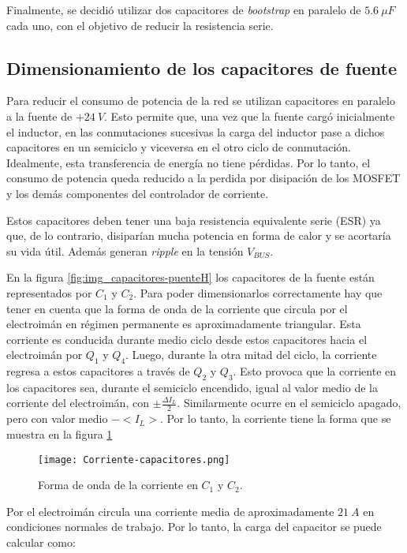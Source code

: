 \noindent Finalmente, se decidió utilizar dos capacitores de \textsl{bootstrap} en paralelo de $5.6 \:\mu F$ cada uno, con el objetivo de reducir la resistencia serie.

\subsection{Dimensionamiento de los capacitores de fuente}

\noindent Para reducir el consumo de potencia de la red se utilizan capacitores en paralelo a la fuente de $+24\:V$. Esto permite que, una vez que la fuente cargó inicialmente el inductor, en las conmutaciones sucesivas la carga del inductor pase a dichos capacitores en un semiciclo y viceversa en el otro ciclo de conmutación. Idealmente, esta transferencia de energía no tiene pérdidas. Por lo tanto, el consumo de potencia queda reducido a la perdida por disipación de los MOSFET y los demás componentes del controlador de corriente. 

\noindent Estos capacitores deben tener una baja resistencia equivalente serie (ESR) ya que, de lo contrario, disiparían mucha potencia en forma de calor y se acortaría su vida útil. Además generan \textsl{ripple} en la tensión $V_{BUS}$.

\noindent En la figura \ref{fig:img_capacitores-puenteH} los capacitores de la fuente están representados por $C_1$ y $C_2$. Para poder dimensionarlos correctamente hay que tener en cuenta que la forma de onda de la corriente que circula por el electroimán en régimen permanente es aproximadamente triangular. Esta corriente es conducida durante medio ciclo desde estos capacitores hacia el electroimán por $Q_1$ y $Q_4$. Luego, durante la otra mitad del ciclo, la corriente regresa a estos capacitores a través de $Q_2$ y $Q_3$. Esto provoca que la corriente en los capacitores sea, durante el semiciclo encendido, igual al valor medio de la corriente del electroimán, con $ \pm \frac{\Delta I_L}{2}$. Similarmente ocurre en el semiciclo apagado, pero con valor medio $-<I_L>$.  Por lo tanto,  la corriente tiene la forma que se muestra en la figura \ref{fig:img_ccorriente-capacitores}

\begin{figure}[H]
	\centering
	\texttt{[image: Corriente-capacitores.png]}
	\caption{Forma de onda de la corriente en $C_1$ y $C_2$.}
	\label{fig:img_ccorriente-capacitores}
\end{figure}

\noindent Por el electroimán circula una corriente media de aproximadamente $21\:A$ en condiciones normales de trabajo. Por lo tanto, la carga del capacitor se puede calcular como:

